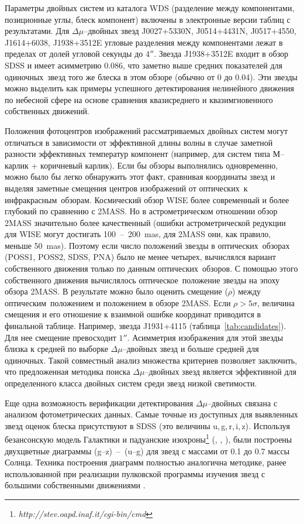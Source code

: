 Параметры двойных систем из каталога WDS (разделение между компонентами, позиционные углы, блеск компонент) включены в электронные версии таблиц с результатами. Для $\Delta\mu$--двойных звезд J0027+5330N, J0514+4431N, J0517+4550, J1614+6038, J1938+3512E угловые разделения между компонентами лежат в пределах от долей угловой секунды до $4''$. Звезда J1938+3512E входит в обзор SDSS и имеет асимметрию 0.086, что заметно выше средних показателей для \glqq одиночных\grqq\ звезд того же блеска в этом обзоре (обычно от 0 до 0.04). Эти звезды можно выделить как примеры успешного детектирования нелинейного движения по небесной сфере на основе сравнения квазисреднего и квазимгновенного собственных движений.

Положения фотоцентров изображений рассматриваемых двойных систем могут отличаться в зависимости от эффективной длины волны в случае заметной разности эффективных температур компонент (например, для систем типа \glqq М--карлик + коричневый карлик\grqq ). Если бы обзоры выполнялись одновременно, можно было бы легко обнаружить этот факт, сравнивая координаты звезд и выделяя заметные смещения центров изображений от \glqq оптических\grqq\ к \glqq инфракрасным\grqq\ обзорам. Космический обзор WISE более современный и более глубокий по сравнению с 2MASS. Но в астрометрическом отношении обзор 2MASS значительно более качественный (ошибки астрометрической редукции для WISE могут достигать 100~--~200~mas, для 2MASS они, как правило, меньше 50~mas). Поэтому если число положений звезды в \glqq оптических\grqq\ обзорах (POSS1, POSS2, SDSS, PNA) было не менее четырех, вычислялся вариант собственного движения только по данным \glqq оптических\grqq\ обзоров. С помощью этого собственного движения вычислялось \glqq оптическое\grqq\ положение звезды на эпоху обзора 2MASS. В результате можно было оценить смещение ($\rho$) между \glqq оптическим\grqq\ положением и положением в обзоре 2MASS. Если $\rho>5\sigma$, величина смещения и его отношение к взаимной ошибке координат приводится в финальной таблице. Например, звезда J1931+4115 (таблица~\ref{tab:candidates}). Для нее смещение превосходит $1''$. Асимметрия изображения для этой звезды близка к средней по выборке $\Delta\mu$--двойных звезд и больше средней для \glqq одиночных\grqq . Такой совместный анализ множества критериев позволяет заключить, что предложенная методика поиска $\Delta\mu$--двойных звезд является эффективной для определенного класса двойных систем среди звезд низкой светимости.

Еще одна возможность верификации детектирования $\Delta\mu$--двойных связана с анализом фотометрических данных. Самые точные из доступных для выявленных звезд оценок блеска присутствуют в SDSS (это величины u,\,g,\,r,\,i,\,z). Используя безансонскую модель Галактики \cite{2003A&A...409..523R} и падуанские изохроны\footnote{\textit{http://stev.oapd.inaf.it/cgi-bin/cmd}} (\cite{2012MNRAS.427..127B}, \cite{2014MNRAS.444.2525C}, \cite{2014MNRAS.445.4287T}), были построены двухцветные диаграммы (g--z)~--~(u--g) для звезд с массами от 0.1 до 0.7 массы Солнца. Техника построения диаграмм полностью аналогична методике, ранее использованной при реализации пулковской программы изучения звезд с большими собственными движениями \cite{2013MNRAS.435.1083K}.


